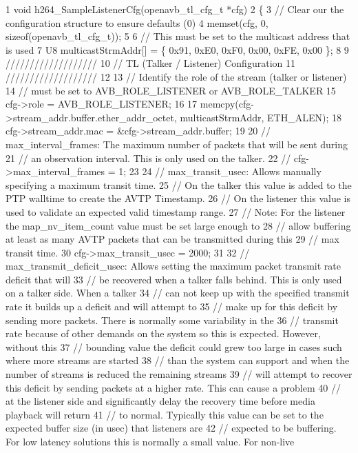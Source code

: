\begin{DoxyCode}
1 void h264\_SampleListenerCfg(openavb\_tl\_cfg\_t *cfg)
2 \{
3     // Clear our the configuration structure to ensure defaults (0)
4     memset(cfg, 0, sizeof(openavb\_tl\_cfg\_t));
5 
6     // This must be set to the multicast address that is used 
7     U8 multicastStrmAddr[] = \{ 0x91, 0xE0, 0xF0, 0x00, 0xFE, 0x00 \};
8 
9     ///////////////////
10     // TL (Talker / Listener) Configuration
11     ///////////////////
12 
13     // Identify the role of the stream (talker or listener)
14     // must be set to AVB\_ROLE\_LISTENER or AVB\_ROLE\_TALKER
15     cfg->role = AVB\_ROLE\_LISTENER;
16 
17     memcpy(cfg->stream\_addr.buffer.ether\_addr\_octet, multicastStrmAddr, ETH\_ALEN);
18     cfg->stream\_addr.mac = &cfg->stream\_addr.buffer;
19 
20     // max\_interval\_frames: The maximum number of packets that will be sent during 
21     // an observation interval. This is only used on the talker.
22     // cfg->max\_interval\_frames = 1;
23 
24     // max\_transit\_usec: Allows manually specifying a maximum transit time. 
25     // On the talker this value is added to the PTP walltime to create the AVTP Timestamp.
26     // On the listener this value is used to validate an expected valid timestamp range.
27     // Note: For the listener the map\_nv\_item\_count value must be set large enough to 
28     // allow buffering at least as many AVTP packets that can be transmitted during this 
29     // max transit time.
30     cfg->max\_transit\_usec = 2000;
31 
32     // max\_transmit\_deficit\_usec: Allows setting the maximum packet transmit rate deficit that will
33     // be recovered when a talker falls behind. This is only used on a talker side. When a talker
34     // can not keep up with the specified transmit rate it builds up a deficit and will attempt to 
35     // make up for this deficit by sending more packets. There is normally some variability in the 
36     // transmit rate because of other demands on the system so this is expected. However, without this
37     // bounding value the deficit could grew too large in cases such where more streams are started 
38     // than the system can support and when the number of streams is reduced the remaining streams 
39     // will attempt to recover this deficit by sending packets at a higher rate. This can cause a problem
40     // at the listener side and significantly delay the recovery time before media playback will return 
41     // to normal. Typically this value can be set to the expected buffer size (in usec) that listeners are 
42     // expected to be buffering. For low latency solutions this is normally a small value. For non-live 

\end{DoxyCode}
